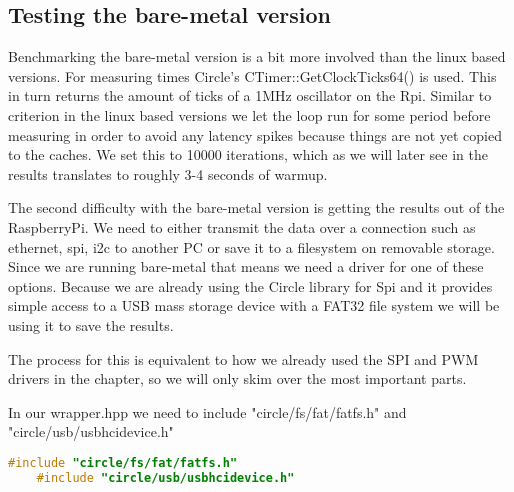 \subsection{Testing the bare-metal version}
Benchmarking the bare-metal version is a bit more involved than the linux based versions.
For measuring times Circle's CTimer::GetClockTicks64() is used. This in turn returns the amount of ticks of a 1MHz oscillator on the Rpi.
Similar to criterion in the linux based versions we let the loop run for some period before measuring
in order to avoid any latency spikes because things are not yet copied to the caches.
We set this to 10000 iterations, which as we will later see in the results translates to roughly 3-4 seconds of warmup.

The second difficulty with the bare-metal version is getting the results out of the RaspberryPi.
We need to either transmit the data over a connection such as ethernet, spi, i2c to another PC or save it to a filesystem on removable storage.
Since we are running bare-metal that means we need a driver for one of these options.
Because we are already using the Circle library for Spi and it provides simple access to a USB mass storage device with a FAT32 file system we will be using it to save the results.

The process for this is equivalent to how we already used the SPI and PWM drivers in the  chapter,
so we will only skim over the most important parts.

In our wrapper.hpp we need to include "circle/fs/fat/fatfs.h" and "circle/usb/usbhcidevice.h"
\begin{lstlisting}[language=C++]
    #include "circle/fs/fat/fatfs.h"
    #include "circle/usb/usbhcidevice.h"
\end{lstlisting}

